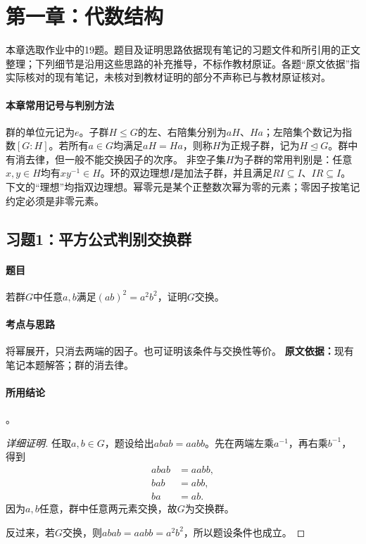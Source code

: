 \section{第一章：代数结构}
本章选取作业中的19题。题目及证明思路依据现有笔记的习题文件和所引用的正文整理；下列细节是沿用这些思路的补充推导，不标作教材原证。各题“原文依据”指实际核对的现有笔记，未核对到教材证明的部分不声称已与教材原证核对。

\paragraph{本章常用记号与判别方法}
群的单位元记为$e$。子群$H\leq G$的左、右陪集分别为$aH$、$Ha$；左陪集个数记为指数$[G:H]$。若所有$a\in G$均满足$aH=Ha$，则称$H$为正规子群，记为$H\trianglelefteq G$。群中有消去律，但一般不能交换因子的次序。
非空子集$H$为子群的常用判别是：任意$x,y\in H$均有$xy^{-1}\in H$。环的双边理想$I$是加法子群，并且满足$RI\subseteq I$、$IR\subseteq I$。下文的“理想”均指双边理想。幂零元是某个正整数次幂为零的元素；零因子按笔记约定必须是非零元素。

\subsection{习题1：平方公式判别交换群}
\paragraph{题目}
若群$G$中任意$a,b$满足$(ab)^2=a^2b^2$，证明$G$交换。
\paragraph{考点与思路}
将幂展开，只消去两端的因子。也可证明该条件与交换性等价。
\textbf{原文依据：}现有笔记本题解答；群的消去律。
\paragraph{所用结论}
。
\begin{proof}[详细证明]
任取$a,b\in G$，题设给出$abab=aabb$。先在两端左乘$a^{-1}$，再右乘$b^{-1}$，得到
\begin{align*}
abab&=aabb,\\
bab&=abb,\\
ba&=ab.
\end{align*}
因为$a,b$任意，群中任意两元素交换，故$G$为交换群。

反过来，若$G$交换，则$abab=aabb=a^2b^2$，所以题设条件也成立。
\end{proof}
